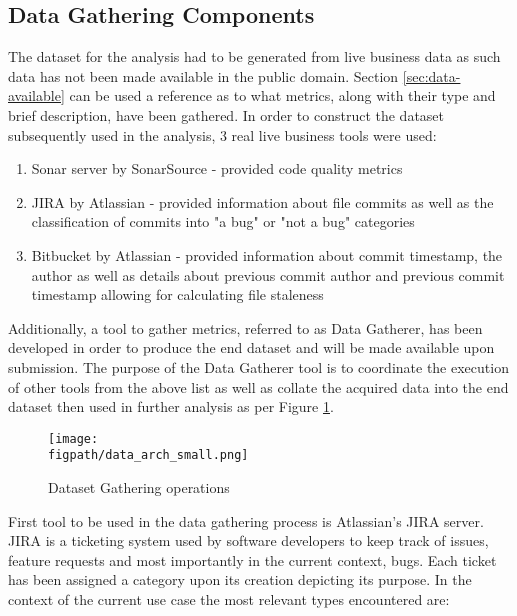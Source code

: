 \subsection{Data Gathering Components}
The dataset for the analysis had to be generated from live business data as such data has not been made available in the public domain. Section \ref{sec:data-available} can be used a reference as to what metrics, along with their type and brief description, have been gathered. In order to construct the dataset subsequently used in the analysis, 3 real live business tools were used:

\begin{enumerate}{\label{lst:tools_used}}
    \item Sonar server by SonarSource - provided code quality metrics
    \item JIRA by Atlassian  - provided information about file commits as well as the classification of commits into "a bug" or "not a bug" categories
    \item Bitbucket by Atlassian  - provided information about commit timestamp, the author as well as details about previous commit author and previous commit timestamp allowing for calculating file staleness 
\end{enumerate}
    
Additionally, a tool to gather metrics, referred to as Data Gatherer, has been developed in order to produce the end dataset and will be made available upon submission. The purpose of the Data Gatherer tool is to coordinate the execution of other tools from the above list as well as collate the acquired data into the end dataset then used in further analysis as per Figure \ref{fig:data_gathering}.

\begin{figure}[h!]
\centering
    \texttt{[image: \\figpath/data\_arch\_small.png]}
    \caption{Dataset Gathering operations}
    \label{fig:data_gathering}
\end{figure}

First tool to be used in the data gathering process is Atlassian's JIRA server. JIRA is a ticketing system used by software developers to keep track of issues, feature requests and most importantly in the current context, bugs. Each ticket has been assigned a category upon its creation depicting its purpose. In the context of the current use case the most relevant types encountered are:

